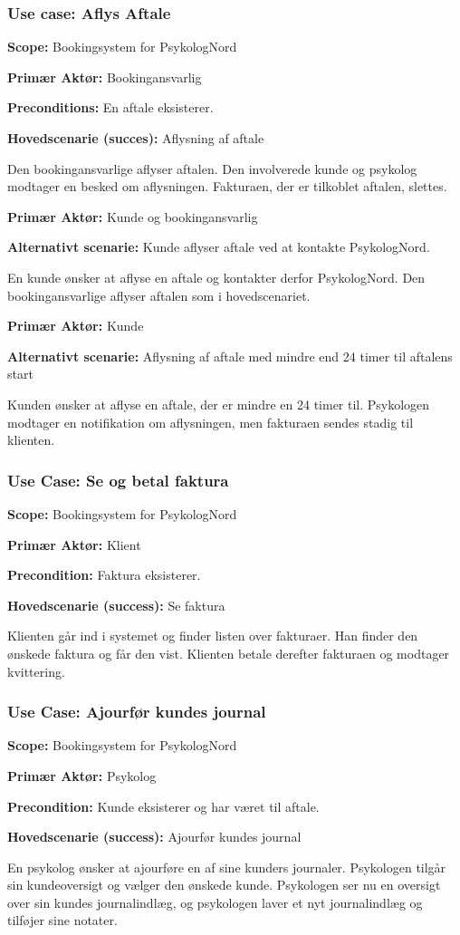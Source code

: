 \subsubsection*{Use case: Aflys Aftale}
{\setlength{\parindent}{0cm}
\textbf{Scope:} Bookingsystem for PsykologNord

\textbf{Primær Aktør:} Bookingansvarlig

\textbf{Preconditions:} En aftale eksisterer.

\textbf{Hovedscenarie (succes):} Aflysning af aftale

Den bookingansvarlige aflyser aftalen.
Den involverede kunde og psykolog modtager en besked om aflysningen. Fakturaen, der er tilkoblet aftalen, slettes.

\textbf{Primær Aktør:} Kunde og bookingansvarlig

\textbf{Alternativt scenarie:} Kunde aflyser aftale ved at kontakte PsykologNord.

En kunde ønsker at aflyse en aftale og kontakter derfor PsykologNord.
Den bookingansvarlige aflyser aftalen som i hovedscenariet.

\textbf{Primær Aktør:} Kunde

\textbf{Alternativt scenarie:} Aflysning af aftale med mindre end 24 timer til aftalens start

Kunden ønsker at aflyse en aftale, der er mindre en 24 timer til.
Psykologen modtager en notifikation om aflysningen, men fakturaen sendes stadig til klienten.
}

\subsubsection*{Use Case: Se og betal faktura}
{\setlength{\parindent}{0cm}
\textbf{Scope:} Bookingsystem for PsykologNord

\textbf{Primær Aktør:} Klient

\textbf{Precondition:} Faktura eksisterer.

\textbf{Hovedscenarie (success):} Se faktura

Klienten går ind i systemet og finder listen over fakturaer. 
Han finder den ønskede faktura og får den vist. Klienten betale derefter fakturaen og modtager kvittering.
}

\subsubsection*{Use Case: Ajourfør kundes journal}
{\setlength{\parindent}{0cm}
\textbf{Scope:} Bookingsystem for PsykologNord

\textbf{Primær Aktør:} Psykolog

\textbf{Precondition:} Kunde eksisterer og har været til aftale.

\textbf{Hovedscenarie (success):} Ajourfør kundes journal

En psykolog ønsker at ajourføre en af sine kunders journaler.
Psykologen tilgår sin kundeoversigt og vælger den ønskede kunde.
Psykologen ser nu en oversigt over sin kundes journalindlæg, og psykologen laver et nyt journalindlæg og tilføjer sine notater.
}



